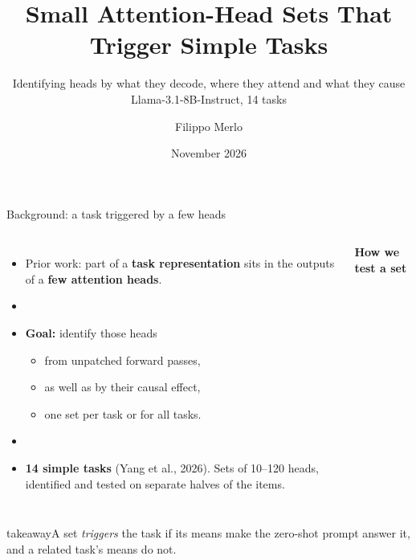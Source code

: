 \documentclass[aspectratio=169,11pt,xcolor=table]{beamer}
\title{Small Attention-Head Sets That Trigger Simple Tasks}
\subtitle{Identifying heads by what they decode, where they attend and what they cause\\
\small Llama-3.1-8B-Instruct, 14 tasks}
\author{Filippo Merlo}
\date{November 2026}
\newcommand{\takeaway}[1]{\vfill
  \begin{beamercolorbox}[wd=\textwidth,sep=6pt]{takeaway}\small #1\end{beamercolorbox}}
\begin{document}
\begin{frame}
\titlepage
\end{frame}

\begin{frame}{Background: a task triggered by a few heads}
\begin{columns}[c]
\begin{itemize}
\item Prior work: part of a \textbf{task representation} sits in the outputs of a
      \textbf{few attention heads}.
\item[]
\item \textbf{Goal:} identify those heads
  \begin{itemize}\small
  \item from unpatched forward passes,
  \item as well as by their causal effect,
  \item one set per task or for all tasks.
  \end{itemize}
\item[]
\item \textbf{14 simple tasks} (Yang et al., 2026). Sets of 10--120 heads, identified and tested on
      separate halves of the items.
\end{itemize}

\centering
\textbf{How we test a set}\\[6pt]
\end{columns}
\takeaway{A set \emph{triggers} the task if its means make the zero-shot prompt answer it,
and a related task's means do not.}
\end{frame}
\end{document}
